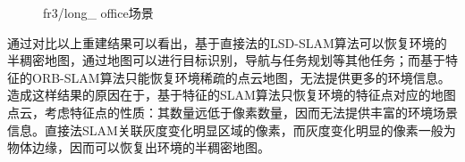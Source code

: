 \begin{figure}[h]
\centering
\caption{fr3/long\_ office场景}
\label{fig3.10}
\end{figure}

通过对比以上重建结果可以看出，基于直接法的LSD-SLAM算法可以恢复环境的半稠密地图，通过地图可以进行目标识别，导航与任务规划等其他任务；而基于特征的ORB-SLAM算法只能恢复环境稀疏的点云地图，无法提供更多的环境信息。造成这样结果的原因在于，基于特征的SLAM算法只恢复环境的特征点对应的地图点云，考虑特征点的性质：其数量远低于像素数量，因而无法提供丰富的环境场景信息。直接法SLAM关联灰度变化明显区域的像素，而灰度变化明显的像素一般为物体边缘，因而可以恢复出环境的半稠密地图。

